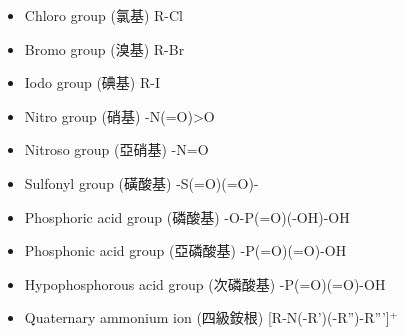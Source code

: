 \documentclass[a4paper,12pt]{report}
\begin{document}
\begin{itemize}
\item Chloro group (氯基) R-Cl
\item Bromo group (溴基) R-Br
\item Iodo group (碘基) R-I
\item Nitro group (硝基) -N(=O)>O
\item Nitroso group (亞硝基) -N=O
\item Sulfonyl group (磺酸基) -S(=O)(=O)-
\item Phosphoric acid group (磷酸基) -O-P(=O)(-OH)-OH
\item Phosphonic acid group (亞磷酸基) -P(=O)(=O)-OH
\item Hypophosphorous acid group (次磷酸基) -P(=O)(=O)-OH
\item Quaternary ammonium ion (四級銨根) [R-N(-R')(-R'')-R''']$^+$
\end{itemize}
\end{document}
